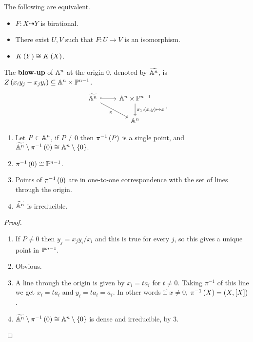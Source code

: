 
\begin{corollary}
The following are equivalent.
\begin{itemize}
\item $ F : X \dashrightarrow Y $ is birational.
\item There exist $ U, V $ such that $ F : U \to V $ is an isomorphism.
\item $ K\rb{Y} \cong K\rb{X} $.
\end{itemize}
\end{corollary}

\begin{definition}
The \textbf{blow-up} of $ \A^n $ at the origin $ 0 $, denoted by $ \widetilde{\A^n} $, is $ Z\rb{x_iy_j - x_jy_i} \subseteq \A^n \times \P^{n - 1} $.
$$
\begin{tikzcd}
\widetilde{\A^n} \arrow[hookrightarrow]{r} \arrow[swap]{dr}{\pi} & \A^n \times \P^{n - 1} \arrow{d}{\pi_1 : \rb{x, y} \mapsto x} \\
& \A^n
\end{tikzcd}.
$$
\end{definition}

\begin{proposition}
\hfill
\begin{enumerate}
\item Let $ P \in \A^n $, if $ P \ne 0 $ then $ \pi^{-1}\rb{P} $ is a single point, and $ \widetilde{\A^n} \setminus \pi^{-1}\rb{0} \cong \A^n \setminus \cb{0} $.
\item $ \pi^{-1}\rb{0} \cong \P^{n - 1} $.
\item Points of $ \pi^{-1}\rb{0} $ are in one-to-one correspondence with the set of lines through the origin.
\item $ \widetilde{\A^n} $ is irreducible.
\end{enumerate}
\end{proposition}

\begin{proof}
\hfill
\begin{enumerate}
\item If $ P \ne 0 $ then $ y_j = x_jy_i/x_i $ and this is true for every $ j $, so this gives a unique point in $ \P^{n - 1} $.
\item Obvious.
\item A line through the origin is given by $ x_i = ta_i $ for $ t \ne 0 $. Taking $ \pi^{-1} $ of this line we get $ x_i = ta_i $ and $ y_i = ta_i = a_i $. In other words if $ x \ne 0 $, $ \pi^{-1}\rb{X} = \rb{X, \sb{X}} $.
\item $ \widetilde{\A^n} \setminus \pi^{-1}\rb{0} \cong \A^n \setminus \cb{0} $ is dense and irreducible, by $ 3 $.
\end{enumerate}
\end{proof}

